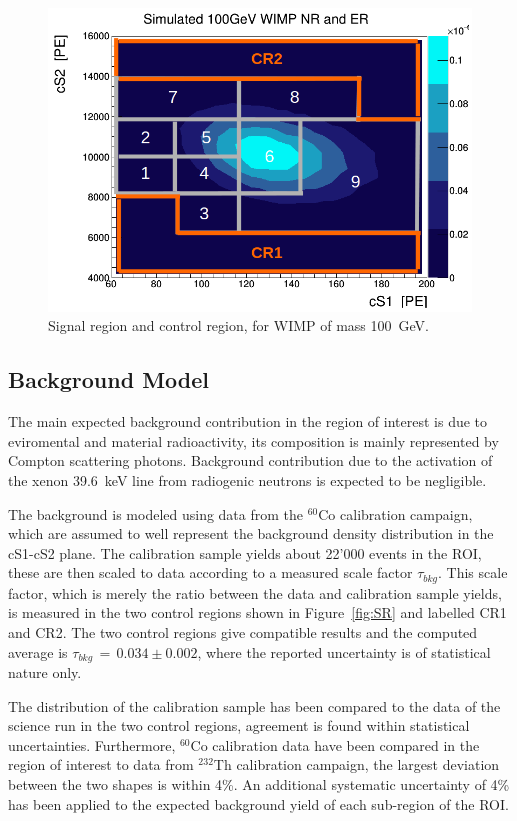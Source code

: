 \begin{figure}[t!]
  \includegraphics[width=\linewidth]{images/wimp_in_sr.png}
  \caption{Signal region and control region, for WIMP of mass 100~GeV.}
  \label{fig:SR2}
\end{figure}


\subsection {Background Model}

The main expected background contribution in the region of interest is due to eviromental and material radioactivity, its composition is mainly
represented by Compton scattering photons. Background contribution due to the activation of the xenon 39.6~keV line from radiogenic neutrons is expected to be negligible.

The background is modeled using data from the $^{60}$Co calibration campaign, which are assumed to well represent the background density distribution 
in the cS1-cS2 plane. 
The calibration sample yields  about 22'000 events in the ROI, these are then scaled to data according to a measured scale factor $\tau_{bkg}$.
This scale factor, which is merely the ratio between the data and calibration sample yields, is measured in the two control regions shown in Figure~\ref{fig:SR} and labelled CR1 and CR2. The two control 
regions give compatible results and the computed average is $\tau_{bkg} \, =  \, 0.034 \pm 0.002 $, where the reported uncertainty 
is of statistical nature only.

The distribution of the calibration sample has been compared to the data of the science run in the two control regions,
agreement is found within statistical uncertainties. Furthermore, $^{60}$Co calibration data have been compared in the region of interest to  
data from $^{232}$Th calibration campaign, the largest deviation between the two shapes is within 4\%. An additional systematic
uncertainty of 4\% has been applied to the expected background yield of each sub-region of the ROI.




